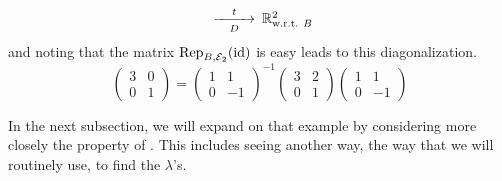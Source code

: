\begin{example}
\begin{equation*}
\begin{CD}
               @>t>D>        
               \Re^2_\wrt{B}
      \end{CD}
\end{equation*}
and noting that the matrix ${\rm Rep}_{B,{\cal E}_2}(\mbox{id})$ is easy
leads to this diagonalization.
\begin{equation*}
   \begin{pmatrix}
     3  &0  \\
     0  &1
   \end{pmatrix}
   =
   \begin{pmatrix}
     1  &1  \\
     0  &-1
   \end{pmatrix}^{-1}
   \begin{pmatrix}
     3  &2  \\
     0  &1
   \end{pmatrix}
   \begin{pmatrix}
     1  &1  \\
     0  &-1
   \end{pmatrix}
\end{equation*}
\end{example}

In the next subsection, we will expand on that example by considering 
more closely the property of .
This includes seeing another way, 
the way that we will routinely use, to find the $\lambda$'s.


